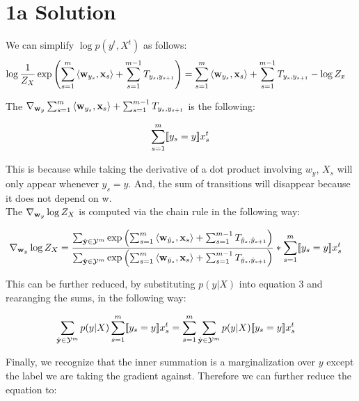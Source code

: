 \documentclass[11pt]{report}
\begin{document}
	
	\maketitle
	\section*{1a Solution}

	We can simplify $\log p(y^t, X^t)$ as follows:
	\begin{align}
	\log \frac{1}{Z_X} \exp \left(\sum_{s=1}^m \left\langle \mathbf{\boldsymbol{w}}_{y_s},\mathbf{\boldsymbol{x}}_s \right\rangle + \sum_{s=1}^{m-1} T_{y_s, y_{s+1}}\right) &= \sum_{s=1}^m \left\langle \mathbf{\boldsymbol{w}}_{y_s},\mathbf{\boldsymbol{x}}_s \right\rangle +  \sum_{s=1}^{m-1} T_{y_s, y_{s+1}} - \log Z_x 
	\end{align}


	The ${\nabla}_{\mathbf{\boldsymbol{w}}_y} \sum_{s=1}^m \left\langle \mathbf{\boldsymbol{w}}_{y_s},\mathbf{\boldsymbol{x}}_s \right\rangle + \sum_{s=1}^{m-1} T_{y_s, y_{s+1}}$ is the following:

	\begin{align}
	\sum_{s=1}^m [\![y_s = y]\!]x_s^t
	\end{align}

	This is because while taking the derivative of a dot product involving $w_y$, $X_s$ will only appear whenever
	$y_s = y$. And, the sum of transitions will disappear because it does not depend on w.\\

	The ${\nabla}_{\mathbf{\boldsymbol{w}}_y} \log Z_X$ is computed via the chain rule in the following way:

	\begin{align}
	{\nabla}_{\mathbf{\boldsymbol{w}}_y} \log Z_X &= \frac{ \sum_{\hat{\mathbf{\boldsymbol{y}}} \in \mathcal{Y}^m} \exp \left(\sum_{s=1}^m \left\langle \mathbf{\boldsymbol{w}}_{\hat{y}_s},\mathbf{\boldsymbol{x}}_s \right\rangle + \sum_{s=1}^{m-1} T_{\hat{y}_s, \hat{y}_{s+1}}\right) }
	{\sum_{\hat{\mathbf{\boldsymbol{y}}} \in \mathcal{Y}^m} \exp \left(\sum_{s=1}^m \left\langle \mathbf{\boldsymbol{w}}_{\hat{y}_s},\mathbf{\boldsymbol{x}}_s \right\rangle + \sum_{s=1}^{m-1} T_{\hat{y}_s, \hat{y}_{s+1}}\right)} * \sum_{s=1}^m [\![y_s = y]\!]x_s^t
	\end{align}

	This can be further reduced, by substituting $p(y|X)$ into equation 3 and rearanging the sums, in the following way:

	\begin{align}
	\sum_{\hat{\mathbf{\boldsymbol{y}}} \in \mathcal{Y}^m} p(y|X) \sum_{s=1}^m [\![y_s = y]\!]x_s^t &= \sum_{s=1}^m  \sum_{\hat{\mathbf{\boldsymbol{y}}} \in \mathcal{Y}^m}   p(y|X)[\![y_s = y]\!]x_s^t
	\end{align}

	Finally, we recognize that the inner summation is a marginalization over $y$ except the label we are taking the gradient against. Therefore we can further reduce the equation to:
\end{document}
